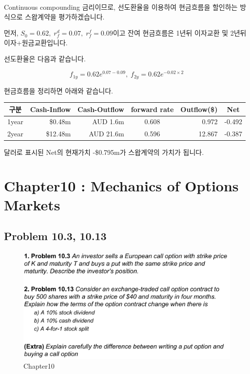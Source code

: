 \documentclass[
  letterpaper,
  DIV=11,
  numbers=noendperiod]{scrreprt}
\begin{document}
Continuous compounding 금리이므로, 선도환율을 이용하여 현금흐름을
할인하는 방식으로 스왑계약을 평가하겠습니다.

먼저, \(S_0=0.62,\;r_f^d=0.07,\;r_f^f=0.09\)이고 잔여 현금흐름은 1년뒤
이자교환 및 2년뒤 이자+원금교환입니다.

선도환율은 다음과 같습니다.

\[f_{1y}=0.62e^{0.07-0.09},\;f_{2y}=0.62e^{-0.02\times 2}\]

현금흐름을 정리하면 아래와 같습니다.

\begin{longtable}[]{@{}crrcrc@{}}
\toprule\noalign{}
구분 & Cash-Inflow & Cash-Outflow & forward rate & Outflow(\$) & Net \\
\midrule\noalign{}
\endhead
\bottomrule\noalign{}
\endlastfoot
1year & \$0.48m & AUD 1.6m & 0.608 & 0.972 & -0.492 \\
2year & \$12.48m & AUD 21.6m & 0.596 & 12.867 & -0.387 \\
\end{longtable}

달러로 표시된 Net의 현재가치 -\$0.795m가 스왑계약의 가치가 됩니다.

\section*{Chapter10 : Mechanics of Options
Markets}\label{chapter10-mechanics-of-options-markets}


\subsection*{\texorpdfstring{\textbf{Problem 10.3,
10.13}}{Problem 10.3, 10.13}}\label{problem-10.3-10.13}

\begin{figure}[H]

{\centering \includegraphics{images/선물옵션_10.png}

}

\caption{Chapter10}

\end{figure}%
\end{document}
